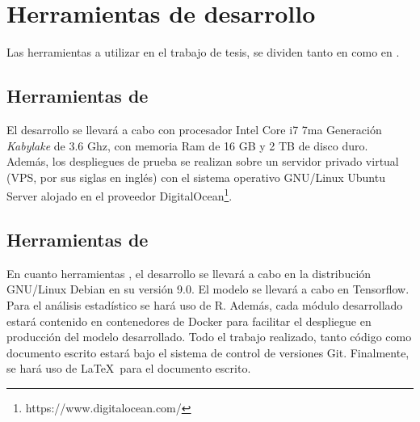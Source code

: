 \section{Herramientas de desarrollo}
\label{sec:herramientas}
Las herramientas a utilizar en el trabajo de tesis, se dividen tanto en  como en .

\subsection{Herramientas de }
El desarrollo se llevará a cabo con procesador Intel Core i7 7ma Generación \textit{Kabylake} de 3.6 Ghz, con memoria Ram de 16 GB y 2 TB de disco duro. Además, los despliegues de prueba se realizan sobre un servidor privado virtual (VPS, por sus siglas en inglés) con el sistema operativo GNU/Linux Ubuntu Server alojado en el proveedor DigitalOcean\footnote{https://www.digitalocean.com/}.

\subsection{Herramientas de }
En cuanto herramientas , el desarrollo se llevará a cabo en la distribución GNU/Linux Debian en su versión 9.0. El modelo se llevará a cabo en Tensorflow. Para el análisis estadístico se hará uso de R. Además, cada módulo desarrollado estará contenido en contenedores de Docker para facilitar el despliegue en producción del modelo desarrollado. Todo el trabajo realizado, tanto código como documento escrito estará bajo el sistema de control de versiones Git. Finalmente, se hará uso de \LaTeX\ para el documento escrito.